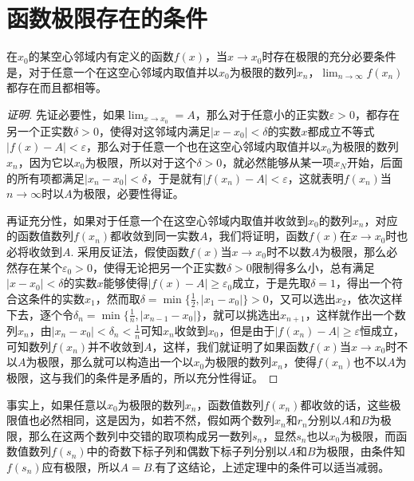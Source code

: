 
\section{函数极限存在的条件}
\label{sec:the-condition-of-function-limit-exist}

\begin{theorem}[函数极限与数列极限的关系]
  在$x_0$的某空心邻域内有定义的函数$f(x)$，当$x \to x_0$时存在极限的充分必要条件是，对于任意一个在这空心邻域内取值并以$x_0$为极限的数列$x_n$，$\lim_{n \to \infty}f(x_n)$都存在而且都相等。
\end{theorem}

\begin{proof}[证明]
  先证必要性，如果$\lim_{x \to x_0} = A$，那么对于任意小的正实数$\varepsilon > 0$，都存在另一个正实数$\delta > 0$，使得对这邻域内满足$|x-x_0|<\delta$的实数$x$都成立不等式$|f(x)-A|<\varepsilon$，那么对于任意一个也在这空心邻域内取值并以$x_0$为极限的数列$x_n$，因为它以$x_0$为极限，所以对于这个$\delta>0$，就必然能够从某一项$x_N$开始，后面的所有项都满足$|x_n-x_0|<\delta$，于是就有$|f(x_n)-A|<\varepsilon$，这就表明$f(x_n)$当$n \to \infty$时以$A$为极限，必要性得证。

  再证充分性，如果对于任意一个在这空心邻域内取值并收敛到$x_0$的数列$x_n$，对应的函数值数列$f(x_n)$都收敛到同一实数$A$，我们将证明，函数$f(x)$在$x \to x_0$时也必将收敛到$A$. 采用反证法，假使函数$f(x)$当$x \to x_0$时不以数$A$为极限，那么必然存在某个$\varepsilon_0>0$，使得无论把另一个正实数$\delta>0$限制得多么小，总有满足$|x-x_0|<\delta$的实数$x$能够使得$|f(x)-A| \geqslant \varepsilon_0$成立，于是先取$\delta=1$，得出一个符合这条件的实数$x_1$，然而取$\delta=\min\{\frac{1}{2}, |x_1-x_0|\}>0$，又可以选出$x_2$，依次这样下去，逐个令$\delta_n=\min\{\frac{1}{n}, |x_{n-1}-x_0|\}$，就可以挑选出$x_{n+1}$，这样就作出一个数列$x_n$，由$|x_n-x_0|<\delta_n<\frac{1}{n}$可知$x_n$收敛到$x_0$，但是由于$|f(x_n)-A| \geqslant \varepsilon$恒成立，可知数列$f(x_n)$并不收敛到$A$，这样，我们就证明了如果函数$f(x)$当$x \to x_0$时不以$A$为极限，那么就可以构造出一个以$x_0$为极限的数列$x_n$，使得$f(x_n)$也不以$A$为极限，这与我们的条件是矛盾的，所以充分性得证。
\end{proof}

事实上，如果任意以$x_0$为极限的数列$x_n$，函数值数列$f(x_n)$都收敛的话，这些极限值也必然相同，这是因为，如若不然，假如两个数列$x_n$和$r_n$分别以$A$和$B$为极限，那么在这两个数列中交错的取项构成另一数列$s_n$，显然$s_n$也以$x_0$为极限，而函数值数列$f(s_n)$中的奇数下标子列和偶数下标子列分别以$A$和$B$为极限，由条件知$f(s_n)$应有极限，所以$A=B$.有了这结论，上述定理中的条件可以适当减弱。

